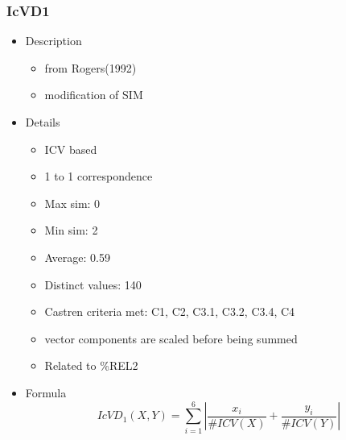 \documentclass{article}
\begin{document}
\subsubsection{IcVD1}
\label{sec-6-4-1}
\begin{itemize}

\item Description
\label{sec-6-4-1-1}%
\begin{itemize}
\item from Rogers(1992)
\item modification of SIM
\end{itemize}

\item Details
\label{sec-6-4-1-2}%
\begin{itemize}
\item ICV based
\item 1 to 1 correspondence
\item Max sim: 0
\item Min sim: 2
\item Average: 0.59
\item Distinct values: 140
\item Castren criteria met: C1, C2, C3.1, C3.2, C3.4, C4
\item vector components are scaled before being summed
\item Related to \%REL2
\end{itemize}

\item Formula\\
\label{sec-6-4-1-3}%
$$
IcVD_{1}(X,Y)=\sum_{i=1}^{6}{\left|\frac{x_{i}}{\#ICV(X)}+\frac{y_{i}}{\#ICV(Y)}\right|}
$$
\end{itemize} %
\end{document}
